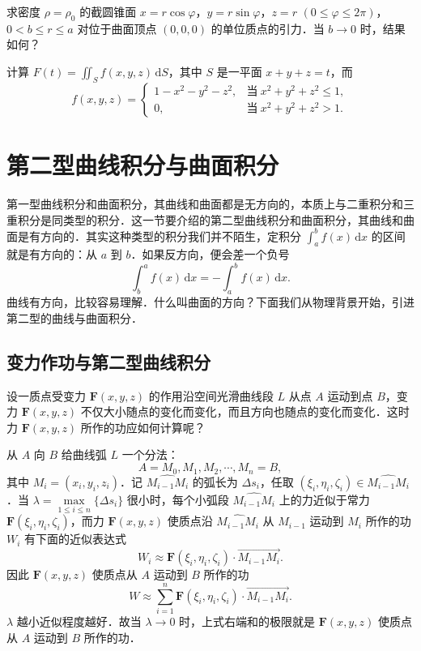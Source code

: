 \begin{xiti}
\begin{ziti}
\end{ziti}
\item 求密度 $\rho=\rho_{0}$ 的截圆锥面 $x=r\cos\varphi$，$y=r\sin\varphi$，$z=r$ $(0\leqslant\varphi\leqslant2\pi)$，$0<b\leqslant r\leqslant a$ 对位于曲面顶点 $(0,0,0)$ 的单位质点的引力．当 $b\to0$ 时，结果如何？
\item 计算 $F(t)=\iint_{S}f(x,y,z)\,\mathrm{d}S$，其中 $S$ 是一平面 $x+y+z=t$，而
\[
f(x,y,z)=\begin{cases}
1-x^{2}-y^{2}-z^{2},&\text{当}\ x^{2}+y^{2}+z^{2}\leqslant1,\\
0,&\text{当}\ x^{2}+y^{2}+z^{2}>1.
\end{cases}
\]
\end{xiti}

\section{第二型曲线积分与曲面积分}

第一型曲线积分和曲面积分，其曲线和曲面都是无方向的，本质上与二重积分和三重积分是同类型的积分．这一节要介绍的第二型曲线积分和曲面积分，其曲线和曲面是有方向的．其实这种类型的积分我们并不陌生，定积分 $\displaystyle\int_{a}^{b}f(x)\,\mathrm{d}x$ 的区间就是有方向的：从 $a$ 到 $b$．如果反方向，便会差一个负号
\[
\int_{b}^{a}f(x)\,\mathrm{d}x=-\int_{a}^{b}f(x)\,\mathrm{d}x.
\]
曲线有方向，比较容易理解．什么叫曲面的方向？下面我们从物理背景开始，引进第二型的曲线与曲面积分．

\subsection{变力作功与第二型曲线积分}

设一质点受变力 $\bm{F}(x,y,z)$ 的作用沿空间光滑曲线段 $L$ 从点 $A$ 运动到点 $B$，变力 $\bm{F}(x,y,z)$ 不仅大小随点的变化而变化，而且方向也随点的变化而变化．这时力 $\bm{F}(x,y,z)$ 所作的功应如何计算呢？

从 $A$ 向 $B$ 给曲线弧 $L$ 一个分法：
\[
A=M_{0},M_{1},M_{2},\cdots,M_{n}=B,
\]
其中 $M_{i}=(x_{i},y_{i},z_{i})$．记 $\widehat{M_{i-1}M_{i}}$ 的弧长为 $\Delta s_{i}$，任取 $(\xi_{i},\eta_{i},\zeta_{i})\in\widehat{M_{i-1}M_{i}}$．当 $\lambda=\max\limits_{1\leqslant i\leqslant n}\{\Delta s_{i}\}$ 很小时，每个小弧段 $\widehat{M_{i-1}M_{i}}$ 上的力近似于常力 $\bm{F}(\xi_{i},\eta_{i},\zeta_{i})$，而力 $\bm{F}(x,y,z)$ 使质点沿 $\widehat{M_{i-1}M_{i}}$ 从 $M_{i-1}$ 运动到 $M_{i}$ 所作的功 $W_{i}$ 有下面的近似表达式
\[
W_{i}\approx\bm{F}(\xi_{i},\eta_{i},\zeta_{i})\cdot\overrightarrow{M_{i-1}M_{i}}.
\]
因此 $\bm{F}(x,y,z)$ 使质点从 $A$ 运动到 $B$ 所作的功
\[
W\approx\sum_{i=1}^{n}\bm{F}(\xi_{i},\eta_{i},\zeta_{i})\cdot\overrightarrow{M_{i-1}M_{i}}.
\]
$\lambda$ 越小近似程度越好．故当 $\lambda\to0$ 时，上式右端和的极限就是 $\bm{F}(x,y,z)$ 使质点从 $A$ 运动到 $B$ 所作的功．

